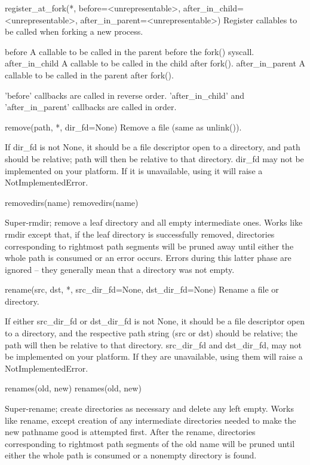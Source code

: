 \documentclass{article}
\begin{document}
    register_at_fork(*, before=<unrepresentable>,
                     after_in_child=<unrepresentable>,
                     after_in_parent=<unrepresentable>)
        Register callables to be called when forking a new process.

          before
            A callable to be called in the parent before the fork() syscall.
          after_in_child
            A callable to be called in the child after fork().
          after_in_parent
            A callable to be called in the parent after fork().

        'before' callbacks are called in reverse order.
        'after_in_child' and 'after_in_parent' callbacks are called in order.

    remove(path, *, dir_fd=None)
        Remove a file (same as unlink()).

        If dir_fd is not None, it should be a file descriptor open to a directory,
          and path should be relative; path will then be relative to that directory.
        dir_fd may not be implemented on your platform.
          If it is unavailable, using it will raise a NotImplementedError.

    removedirs(name)
        removedirs(name)

        Super-rmdir; remove a leaf directory and all empty intermediate
        ones.  Works like rmdir except that, if the leaf directory is
        successfully removed, directories corresponding to rightmost path
        segments will be pruned away until either the whole path is
        consumed or an error occurs.  Errors during this latter phase are
        ignored -- they generally mean that a directory was not empty.

    rename(src, dst, *, src_dir_fd=None, dst_dir_fd=None)
        Rename a file or directory.

        If either src_dir_fd or dst_dir_fd is not None, it should be a file
          descriptor open to a directory, and the respective path string (src or dst)
          should be relative; the path will then be relative to that directory.
        src_dir_fd and dst_dir_fd, may not be implemented on your platform.
          If they are unavailable, using them will raise a NotImplementedError.

    renames(old, new)
        renames(old, new)

        Super-rename; create directories as necessary and delete any left
        empty.  Works like rename, except creation of any intermediate
        directories needed to make the new pathname good is attempted
        first.  After the rename, directories corresponding to rightmost
        path segments of the old name will be pruned until either the
        whole path is consumed or a nonempty directory is found.
\end{document}
